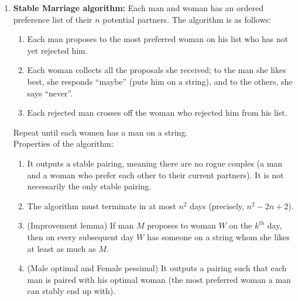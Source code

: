 \documentclass[10pt]{article}
\begin{document}
\begin{multicols}{2}
\begin{enumerate}
    \item \textbf{Stable Marriage algorithm:} Each man and woman has an ordered preference list of their $n$ potential partners. The algorithm is as follows: 
    \begin{enumerate}
        \item Each man proposes to the most preferred woman on his list who has not yet rejected him.
        \item Each woman collects all the proposals she received; to the man she likes best, she responds “maybe” (puts him on a string), and to the others, she says “never”.
        \item Each rejected man crosses off the woman who rejected him from his list.
    \end{enumerate}
    Repeat until each women has a man on a string. \\
    Properties of the algorithm:
    \begin{enumerate}
        \item It outputs a stable pairing, meaning there are no rogue couples (a man and a woman who prefer each other to their current partners). It is not necessarily the only stable pairing.
        \item The algorithm must terminate in at most $n^2$ days (precisely, $n^2-2n+2$).
        \item (Improvement lemma) If man $M$ proposes to woman $W$ on the $k^{th}$ day, then on every subsequent day $W$ has someone on a string whom she likes at least as much as $M$.
        \item (Male optimal and Female pessimal) It outputs a pairing such that each man is paired with his optimal woman (the most preferred woman a man can stably end up with). 
    \end{enumerate}
    

\end{enumerate}
\end{multicols}
\end{document}
